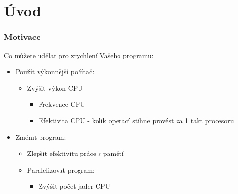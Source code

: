 \documentclass{beamer}
\subtitle{Lekce 01. Úvod}
\author{Pavel Píša \phantom{xxxxxxxxx} Petr Štěpán \\ \small\texttt{pisa@fel.cvut.cz}\phantom{xxxx}\small\texttt{stepan@fel.cvut.cz}}
\begin{document}
\maketitle

\section{Úvod}


\begin{frame}
\frametitle{Motivace}

Co můžete udělat pro zrychlení Vašeho programu:
\begin{itemize}
\item Použít výkonnější počítač:
  \begin{itemize}
  \item Zvýšit výkon CPU 
    \begin{itemize}
    \item Frekvence CPU
    \item Efektivita CPU - kolik operací stihne provést za 1 takt procesoru
    \end{itemize}
  \end{itemize}
\item Změnit program:
  \begin{itemize}
  \item Zlepšit efektivitu práce s pamětí
  \item Paralelizovat program:
    \begin{itemize}
    \item Zvýšit počet jader CPU
    \end{itemize}
  \end{itemize}
\end{itemize}
\end{frame}
\end{document}
